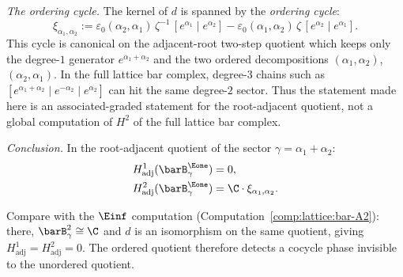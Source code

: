 \begin{computation}
\emph{The ordering cycle.}
The kernel of $d$ is spanned by the
\emph{ordering cycle}:
\begin{equation}\label{eq:lattice:ordering-cycle}
\xi_{\alpha_1,\alpha_2}
:= \varepsilon_0(\alpha_2,\alpha_1)\,\zeta^{-1}\,
 [e^{\alpha_1} \mid e^{\alpha_2}]
 - \varepsilon_0(\alpha_1,\alpha_2)\,\zeta\,
 [e^{\alpha_2} \mid e^{\alpha_1}].
\end{equation}
This cycle is canonical on the adjacent-root two-step quotient
which keeps only the degree-$1$ generator $e^{\alpha_1+\alpha_2}$
and the two ordered decompositions
$(\alpha_1,\alpha_2)$, $(\alpha_2,\alpha_1)$. In the full lattice
bar complex, degree-$3$ chains such as
$[e^{\alpha_1+\alpha_2}\mid e^{-\alpha_2}\mid e^{\alpha_2}]$
can hit the same degree-$2$ sector. Thus the statement made here is
an associated-graded statement for the root-adjacent quotient, not a
global computation of $H^2$ of the full lattice bar complex.

\emph{Conclusion.} In the root-adjacent quotient of the sector
$\gamma = \alpha_1 + \alpha_2$:
\begin{align*}
H^1_{\mathrm{adj}}(\barB^{\Eone}_\gamma) &= 0, \\
H^2_{\mathrm{adj}}(\barB^{\Eone}_\gamma) &=
\C \cdot \xi_{\alpha_1,\alpha_2}.
\end{align*}

Compare with the $\Einf$ computation
(Computation~\ref{comp:lattice:bar-A2}):
there, $\barB^2_\gamma \cong \C$ and $d$ is an isomorphism on the
same quotient, giving $H^1_{\mathrm{adj}}=H^2_{\mathrm{adj}}=0$.
The ordered quotient therefore detects a cocycle phase invisible to
the unordered quotient.
\end{computation}


